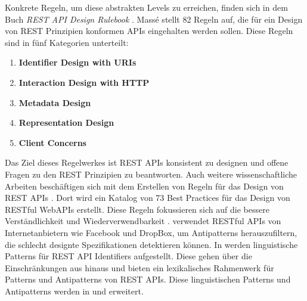 Konkrete Regeln, um diese abstrakten Levels zu erreichen, finden sich in dem Buch \textit{REST API Design Rulebook} \parencite{masse_rest_2011}.
Massé stellt 82 Regeln auf, die für ein Design von \acs{REST} Prinzipien konformen \acs{API}s eingehalten werden sollen. Diese Regeln sind in fünf Kategorien unterteilt:
\begin{enumerate}
  \item \textbf{Identifier Design with \acs{URI}s}
  \item \textbf{Interaction Design with \acs{HTTP}}
  \item \textbf{Metadata Design}
  \item \textbf{Representation Design}
  \item \textbf{Client Concerns}
\end{enumerate}

Das Ziel dieses Regelwerkes ist \acs{REST} \acs{API}s konsistent zu designen und offene Fragen zu den \acs{REST} Prinzipien zu beantworten. Auch weitere wissenschaftliche Arbeiten beschäftigen sich mit dem Erstellen von Regeln für das Design von \acs{REST} \acs{API}s \parencite{petrillo_are_2016}. Dort wird ein Katalog von 73 Best Practices für das Design von \acs{REST}ful Web\acs{API}s erstellt. Diese Regeln fokussieren sich auf die bessere Verständlichkeit und Wiederverwendbarkeit \parencite{petrillo_are_2016}. \parencite{palma_detection_2014} verwendet \acs{REST}ful \acs{API}s von Internetanbietern wie Facebook und DropBox, um Antipatterns herauszufiltern, die schlecht designte Spezifikationen detektieren können. In \parencite{palma_are_2015} werden linguistische Patterns für \acs{REST} \acs{API} Identifiers aufgestellt. Diese gehen über die Einschränkungen aus \parencite{masse_rest_2011} hinaus und bieten ein lexikalisches Rahmenwerk für Patterns und Antipatterns von \acs{REST} \acs{API}s. Diese linguistischen Patterns und Antipatterns werden in \parencite{palma_semantic_2017} und \parencite{palma_assessing_2022} erweitert. 

